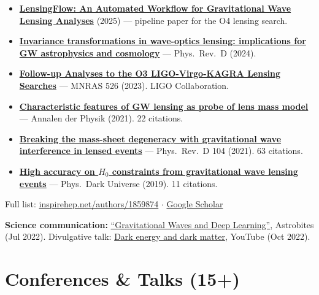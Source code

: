 \documentclass[10pt,a4paper]{article}
\begin{document}
\vspace{3pt}
\begin{itemize}[noitemsep, topsep=0pt, leftmargin=1.2em]
  \item \href{https://arxiv.org/abs/2507.20256}{\textbf{LensingFlow: An Automated Workflow for
        Gravitational Wave Lensing Analyses}} (2025) — pipeline paper for the O4 lensing search.
  \item \href{https://arxiv.org/abs/2408.03856}{\textbf{Invariance transformations in wave-optics
        lensing: implications for GW astrophysics and cosmology}} — Phys.\ Rev.\ D (2024).
  \item \href{https://academic.oup.com/mnras/article/526/3/3832/7283182?login=false}{\textbf{Follow-up
        Analyses to the O3 LIGO-Virgo-KAGRA Lensing Searches}} — MNRAS 526 (2023). LIGO Collaboration.
  \item \href{https://doi.org/10.1002/andp.202300040}{\textbf{Characteristic features of GW lensing
        as probe of lens mass model}} — Annalen der Physik (2021). 22 citations.
  \item \href{https://doi.org/10.1103/PhysRevD.104.023503}{\textbf{Breaking the mass-sheet degeneracy
        with gravitational wave interference in lensed events}} — Phys.\ Rev.\ D 104 (2021). 63 citations.
  \item \href{https://doi.org/10.1016/j.dark.2020.100654}{\textbf{High accuracy on $H_0$ constraints
        from gravitational wave lensing events}} — Phys.\ Dark Universe (2019). 11 citations.
\end{itemize}

\vspace{3pt}
{\small Full list:
  \href{https://inspirehep.net/authors/1859874}{inspirehep.net/authors/1859874}
  $\cdot$
  \href{https://scholar.google.com/citations?user=MDkJARoAAAAJ&hl=en}{Google Scholar}
}

\vspace{3pt}
\textbf{Science communication:} \href{https://astrobites.org/2022/07/27/gravitational-waves-deep-learning/}{``Gravitational Waves and Deep Learning''}, Astrobites (Jul 2022). Divulgative talk: \href{https://www.youtube.com/watch?v=C_XUue2sDwg}{Dark energy and dark matter}, YouTube (Oct 2022).

\section{Conferences \& Talks (15+)}
\end{document}
